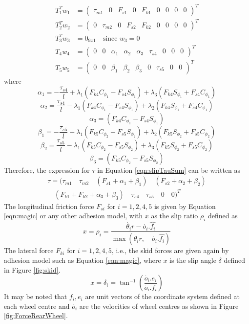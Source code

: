 \begin{subequations}
	\label{eqn:slip_Tau_is}
	\begin{align}
	T_1^T w_1&=\begin{pmatrix}
	\tau_{m1} & 0 & F_{s1}& 0& F_{k1}&0&0&0&0
	\end{pmatrix} ^T\\
	T_2^T w_2&=\begin{pmatrix}
	0&\tau_{m2}& 0&F_{s2}&  F_{k2}&0&0&0&0
	\end{pmatrix} ^T\\
	T_3^T w_3&=0_{9x1} \quad \text{since } w_3=0\\
	T_4w_4&= \begin{pmatrix}
	0 & 0& \alpha_1& \alpha_2 & \alpha_3 &\tau_{s4}& 0&0 &0
	\end{pmatrix}^T\\
	T_5w_5&=\begin{pmatrix}
	0 & 0& \beta_1& \beta_2 & \beta_3 &0 &\tau_{s5}& 0&0
	\end{pmatrix}^T
	\end{align}
\end{subequations}
where 
\[\alpha_1=-\frac{\tau_{s4}}{l}+\lambda_1(F_{k4}C_{\phi_1}-F_{s4}S_{\phi_1})+\lambda_3(F_{k4}S_{\phi_1}+F_{s4}C_{\phi_1})\]
\[\alpha_2=\frac{\tau_{s4}}{l}-\lambda_1(F_{k4}C_{\phi_1}-F_{s4}S_{\phi_1})+\lambda_2(F_{k4}S_{\phi_1}+F_{s4}C_{\phi_1})\]
\[\alpha_3=(F_{k4}C_{\phi_1}-F_{s4}S_{\phi_1})\]
\[\beta_1=-\frac{\tau_{s5}}{l}+\lambda_1(F_{k5}C_{\phi_2}-F_{s5}S_{\phi_2})+\lambda_2(F_{k5}S_{\phi_2}+F_{s5}C_{\phi_2})\]
\[\beta_2=\frac{\tau_{s5}}{l}-\lambda_1(F_{k5}C_{\phi_2}-F_{s5}S_{\phi_2})+\lambda_3(F_{k5}S_{\phi_2}+F_{s5}C_{\phi_2})\]
\[\beta_3=(F_{k5}C_{\phi_2}-F_{s5}S_{\phi_2})\]
Therefore, the expression for  $\tau$ in  Equation \ref{eqn:slipTauSum} can be written as
\begin{multline}
\tau=(
\tau_{m1} \quad \tau_{m2} \quad (F_{s1}+\alpha_1+\beta_1) \quad( F_{s2}+\alpha_2+\beta_2) \\
 \quad  (F_{k1}+ F_{k2}+\alpha_3+\beta_3)\quad \tau_{s4}\quad  \tau_{s5} \quad 0 \quad 0 )  ^T
\end{multline}
The longitudinal  friction force $F_{si}$ for $i=1,2,4,5 $ is given by Equation \ref{eqn:magic} or any other adhesion model, with $ x $ as the slip ratio $\rho_i$ defined as
\[
x = \rho_i = \frac{\dot{\theta_i} r - \dot{o_i}.\hat{f_i}}{\max(\dot{\theta_i} r,\quad \dot{o_i}.\hat{f_i})}
\]
The lateral force  $F_{ki}$ for $i=1,2,4,5 $, i.e., the skid forces are given again by adhesion model such as Equation \ref{eqn:magic},  where $x$ is the slip angle $\delta$ defined in Figure \ref{fig:skid}. 
\[
x = \delta_i=\tan^{-1}(\frac{\dot{o_i}.e_i}{\dot{o_i}.f_i})
\]
It may be noted that $f_i,e_i$ are unit vectors of the coordinate system defined at each wheel centre and $\dot{o_i}$ are the velocities of wheel centres as shown in Figure  \ref{fig:ForceRearWheel}.
